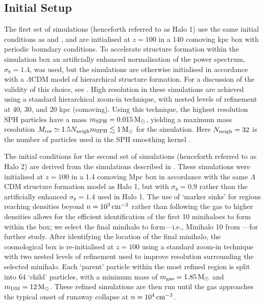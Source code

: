 \documentclass[usenatbib]{mn2e}
\newcommand{\cc}{\,{\rm cm}^{-3}}
\newcommand{\msun}{\,{\rm M}_{\odot}}
\begin{document}
\subsection{Initial Setup}
\label{setup}
The first set of simulations (henceforth referred to as Halo 1) use the same initial conditions as \citet{Hummeletal2015} and \citet{StacyGreifBromm2010}, and are initialised at $z=100$ in a 140 comoving kpc box with periodic boundary conditions. 
To accelerate structure formation within the simulation box an artificially enhanced normalisation of the power spectrum, $\sigma_8 = 1.4$, was used, but the simulations are otherwise initialised in accordance with a $\Lambda$CDM model of hierarchical structure formation. 
For a discussion of the validity of this choice, see \citet{StacyGreifBromm2010}. High resolution in these simulations are achieved using a standard hierarchical zoom-in technique, with nested levels of refinement at 40, 30, and 20 kpc (comoving).  
Using this technique, the highest resolution SPH particles have a mass $m_{\rm SPH} = 0.015\msun$, yielding a maximum mass resolution $M_{\rm res} \simeq 1.5 N_{\rm neigh} m_{\rm SPH} \lesssim 1\msun$ for the simulation.  
Here $N_{\rm neigh} = 32$ is the number of particles used in the SPH smoothing kernel \citep{BateBurkert1997}.

The initial conditions for the second set of simulations (henceforth referred to as Halo 2) are derived from the simulations described in \citet{StacyBromm2013}.  
These simulations were initialised at $z=100$ in a 1.4 comoving Mpc box in accordance with the same $\Lambda$CDM structure formation model as Halo 1, but with $\sigma_8 = 0.9$ rather than the artificially enhanced $\sigma_8 = 1.4$ used in Halo 1. 
The use of `marker sinks'  for regions reaching densities beyond $n=10^3\,{\rm cm}^{-3}$ rather than following the gas to higher densities allows for the efficient identification of the first 10 minihaloes to form within the box; we select the final minihalo to form---i.e., Minihalo 10 from \citet{StacyBromm2013}---for further study.  
After identifying the location of the final minihalo, the cosmological box is re-initialised at $z=100$ using a standard zoom-in technique with two nested levels of refinement used to improve resolution surrounding the selected minihalo.  
Each `parent' particle within the most refined region is split into 64 `child' particles, with a minimum mass of $m_{\rm gas}=1.85\msun$ and $m_{\rm \small DM}=12\msun$. 
These refined simulations are then run until the gas approaches the typical onset of runaway collapse at $n=10^4\cc$.
\end{document}
